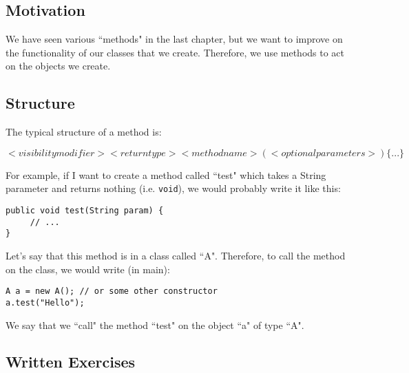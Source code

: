 
\subsection{Motivation}
We have seen various ``methods" in the last chapter, but we want to improve on the functionality of our classes that we create. Therefore, we use methods to act on the objects we create. 

\subsection{Structure}
The typical structure of a method is:
\begin{center}
$<visibilitymodifier> <return type> <method name>(<optional parameters>) \{...\}$
\end{center}
For example, if I want to create a method called ``test" which takes a String parameter and returns nothing (i.e. \verb|void|), we would probably write it like this:
\begin{lstlisting}
public void test(String param) {
     // ...
}
\end{lstlisting}
Let's say that this method is in a class called ``A". Therefore, to call the method on the class, we would write (in main):
\begin{lstlisting}
A a = new A(); // or some other constructor
a.test("Hello");
\end{lstlisting}
We say that we ``call" the method ``test" on the object ``a" of type ``A".

\subsection{Written Exercises}

